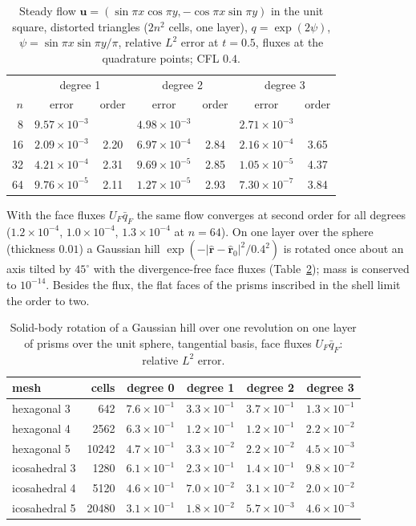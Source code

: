 \documentclass[preprint,12pt]{elsarticle}
\newcommand{\bu}{\mathbf{u}}
\theoremstyle{definition}
\begin{document}
\begin{table}[h]
\centering
\caption{Steady flow $\bu=(\sin\pi x\cos\pi y,-\cos\pi x\sin\pi y)$ in the unit square, distorted
triangles ($2n^2$ cells, one layer), $q=\exp(2\psi)$, $\psi=\sin\pi x\sin\pi y/\pi$, relative $L^2$
error at $t=0.5$, fluxes at the quadrature points; CFL $0.4$.}
\label{tab:plane}
\begin{tabular}{rcccccc}
\toprule
 & \multicolumn{2}{c}{degree 1} & \multicolumn{2}{c}{degree 2} & \multicolumn{2}{c}{degree 3} \\
$n$ & error & order & error & order & error & order \\
\midrule
8 & $9.57\times10^{-3}$ & & $4.98\times10^{-3}$ & & $2.71\times10^{-3}$ & \\
16 & $2.09\times10^{-3}$ & 2.20 & $6.97\times10^{-4}$ & 2.84 & $2.16\times10^{-4}$ & 3.65 \\
32 & $4.21\times10^{-4}$ & 2.31 & $9.69\times10^{-5}$ & 2.85 & $1.05\times10^{-5}$ & 4.37 \\
64 & $9.76\times10^{-5}$ & 2.11 & $1.27\times10^{-5}$ & 2.93 & $7.30\times10^{-7}$ & 3.84 \\
\bottomrule
\end{tabular}
\end{table}

With the face fluxes $U_F\bar q_F$ the same flow converges at second order for all degrees ($1.2\times10^{-4}$,
$1.0\times10^{-4}$, $1.3\times10^{-4}$ at $n=64$). On one layer over the sphere (thickness $0.01$) a
Gaussian hill $\exp(-|\hat{\mathbf r}-\hat{\mathbf r}_0|^2/0.4^2)$ is rotated once about an axis tilted by
$45^\circ$ with the divergence-free face fluxes (Table~\ref{tab:sphere}); mass is conserved to $10^{-14}$.
Besides the flux, the flat faces of the prisms inscribed in the shell limit the order to two.

\begin{table}[h]
\centering
\caption{Solid-body rotation of a Gaussian hill over one revolution on one layer of prisms over the
unit sphere, tangential basis, face fluxes $U_F\bar q_F$: relative $L^2$ error.}
\label{tab:sphere}
\begin{tabular}{lrcccc}
\toprule
mesh & cells & degree 0 & degree 1 & degree 2 & degree 3 \\
\midrule
hexagonal 3 & 642 & $7.6\times10^{-1}$ & $3.3\times10^{-1}$ & $3.7\times10^{-1}$ & $1.3\times10^{-1}$ \\
hexagonal 4 & 2562 & $6.3\times10^{-1}$ & $1.2\times10^{-1}$ & $1.2\times10^{-1}$ & $2.2\times10^{-2}$ \\
hexagonal 5 & 10242 & $4.7\times10^{-1}$ & $3.3\times10^{-2}$ & $2.2\times10^{-2}$ & $4.5\times10^{-3}$ \\
icosahedral 3 & 1280 & $6.1\times10^{-1}$ & $2.3\times10^{-1}$ & $1.4\times10^{-1}$ & $9.8\times10^{-2}$ \\
icosahedral 4 & 5120 & $4.6\times10^{-1}$ & $7.0\times10^{-2}$ & $3.1\times10^{-2}$ & $2.0\times10^{-2}$ \\
icosahedral 5 & 20480 & $3.1\times10^{-1}$ & $1.8\times10^{-2}$ & $5.7\times10^{-3}$ & $4.6\times10^{-3}$ \\
\bottomrule
\end{tabular}
\end{table}
\end{document}
